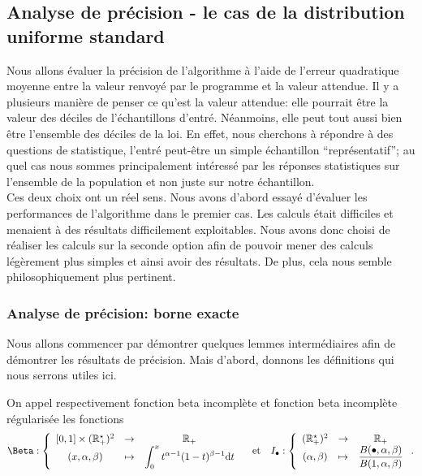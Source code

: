 \subsection{Analyse de précision - le cas de la distribution uniforme standard}

Nous allons évaluer la précision de l'algorithme à l'aide de l'erreur quadratique moyenne entre la valeur renvoyé par le programme et la valeur attendue. Il y a plusieurs manière de penser ce qu'est la valeur attendue: elle pourrait être la valeur des déciles de l'échantillons d'entré. Néanmoins, elle peut tout aussi bien être l'ensemble des déciles de la loi. En effet, nous cherchons à répondre à des questions de statistique, l'entré peut-être un simple échantillon ``représentatif'';  au quel cas nous sommes principalement intéressé par les réponses statistiques sur l'ensemble de la population et non juste sur notre échantillon.\\

Ces deux choix ont un réel sens. Nous avons d'abord essayé d'évaluer les performances de l'algorithme dans le premier cas. Les calculs était difficiles et menaient à des résultats difficilement exploitables. Nous avons donc choisi de réaliser les calculs sur la seconde option afin de pouvoir mener des calculs légèrement plus simples et ainsi avoir des résultats. De plus, cela nous semble philosophiquement plus pertinent.

\subsubsection{Analyse de précision: borne exacte}

Nous allons commencer par démontrer quelques lemmes intermédiaires afin de démontrer les résultats de précision. Mais d'abord, donnons les définitions qui nous serrons utiles ici.\\

\begin{definition}
    On appel respectivement fonction beta incomplète et fonction beta incomplète régularisée les fonctions 
    \[
        \Beta : \left\{ 
            \begin{array}[]{ccc}
                [0,1] \times (\R_+^\star)^2 & \to & \R_+\\
                (x, \alpha, \beta) & \mapsto & \displaystyle\int_0^x t^{\alpha - 1} (1 - t)^{\beta -1} \dt t
            \end{array}
        \right. \quad \text{et} \quad  I_\bullet : \left\{ 
            \begin{array}[]{ccc}
                (\R_+^\star)^2 & \to & \R_+\\
                (\alpha, \beta) & \mapsto & \dfrac{B(\bullet, \alpha, \beta)}{B(1, \alpha, \beta)}
            \end{array}
        \right.  .
    \]
\end{definition}

